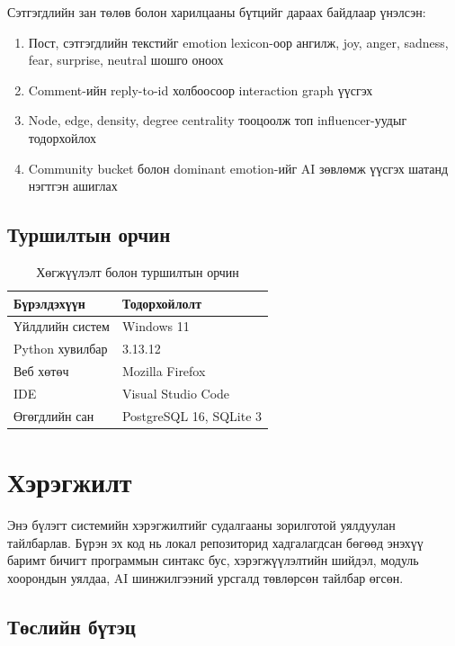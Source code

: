 \documentclass[12pt,a4paper]{report}
\begin{document}
Сэтгэгдлийн зан төлөв болон харилцааны бүтцийг дараах байдлаар үнэлсэн:
\begin{enumerate}
    \item Пост, сэтгэгдлийн текстийг emotion lexicon-оор ангилж,
    joy, anger, sadness, fear, surprise, neutral шошго оноох
    \item Comment-ийн reply-to-id холбоосоор interaction graph үүсгэх
    \item Node, edge, density, degree centrality тооцоолж топ influencer-уудыг тодорхойлох
    \item Community bucket болон dominant emotion-ийг AI зөвлөмж үүсгэх шатанд нэгтгэн ашиглах
\end{enumerate}


\section{Туршилтын орчин}

\begin{table}[H]
\centering
\caption{Хөгжүүлэлт болон туршилтын орчин}
\begin{tabular}{|l|l|}
\hline
\textbf{Бүрэлдэхүүн} & \textbf{Тодорхойлолт} \\
\hline
Үйлдлийн систем & Windows 11 \\
Python хувилбар & 3.13.12 \\
Веб хөтөч & Mozilla Firefox \\
IDE & Visual Studio Code \\
Өгөгдлийн сан & PostgreSQL 16, SQLite 3 \\
\hline
\end{tabular}
\end{table}

\chapter{Хэрэгжилт}

Энэ бүлэгт системийн хэрэгжилтийг судалгааны зорилготой уялдуулан тайлбарлав. Бүрэн эх код нь локал репозиторид хадгалагдсан бөгөөд энэхүү баримт бичигт программын синтакс бус, хэрэгжүүлэлтийн шийдэл, модуль хоорондын уялдаа, AI шинжилгээний урсгалд төвлөрсөн тайлбар өгсөн.

\section{Төслийн бүтэц}
\end{document}
